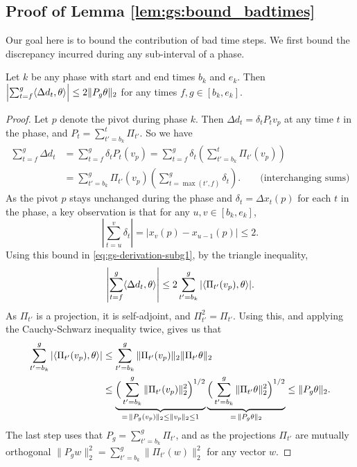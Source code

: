 \subsection {Proof of Lemma \ref{lem:gs:bound_badtimes}}
Our goal here is to bound the contribution of bad time steps. We first bound the discrepancy incurred during any sub-interval of a phase.
\begin{lemma}
\label{lem:gs-discphase}
    Let $k$ be any phase with start and end times $b_k$ and $e_k$. Then $\left|\sum_{t=f}^g \langle  \Delta d_t,\theta\rangle\right| \leq  2 \|P_{g}\theta\|_2$ for any times $f,g \in [b_k, e_k]$. 
\end{lemma}
    \begin{proof}
    Let $p$ denote the pivot during phase $k$.
 Then $\Delta d_t = \delta_t P_t v_p$ at any time $t$ in the phase, and $P_t = \sum_{t'=b_k}^t \Pi_{t'}$. So we have
  \begin{align}
     \sum_{t=f}^g \Delta d_t 
& =\sum_{t=f}^{g} \delta_t  P_t(v_p)  = \sum_{t=f}^{g} \delta_t \left(\sum_{t'=b_k}^t \Pi_{t'}(v_p) \right)
\nonumber \\
 & =  \sum_{t'=b_k}^{g}  \Pi_{t'}(v_p) \left(\sum_{t= \max(t',f)}^{g} \delta_t \right). 
 \qquad \text{(interchanging sums)} \label{eq:gs-derivation-subg1}
\end{align} 
As the pivot $p$ stays unchanged during the phase and $\delta_t= \Delta x_t (p)$ for each $t$ in the phase, a key observation is that  for any $u,v \in [b_k,e_k]$,
\[\left|\sum_{t=u}^{v} \delta_{t}\right| = |x_{v}(p)-x_{u-1}(p) | \leq 2.\]
Using this bound in \eqref{eq:gs-derivation-subg1}, by the triangle inequality,
\[  \left|\sum_{t=f}^g \langle  \Delta d_t,\theta\rangle\right| \leq  2  \sum_{t'=b_k}^{g}  |\langle \Pi_{t'}(v_p),\theta\rangle |. \]
As $\Pi_{t'}$ is a projection, it is self-adjoint, and $\Pi_{t'}^2 =
\Pi_{t'}$. Using this, and applying the Cauchy-Schwarz inequality twice,
gives us that  
\begin{align*} \sum_{t'=b_k}^{g} |  \langle \Pi_{t'}(v_{p}),\theta\rangle| 
      & 
 \leq   \sum_{t'=b_k}^{g} \| \Pi_{t'}(v_{p}) \|_2 \|\Pi_{t'} \theta\|_2 \\
   &  \leq \underbrace{\Big( \sum_{t'=b_k}^{g}  \|\Pi_{t'}(v_{p})\|_2^2 \Big)^{1/2}}_{=\, \|P_g(v_{p})\|_2 \leq \|v_p\|_2\leq 1 } \underbrace{\Big( \sum_{t'=b_k}^{g}  \|\Pi_{t'} \theta\|_2^2 \Big)^{1/2}}_{  =\, \|P_g\theta \|_2  }  
   \leq  \|P_g \theta \|_2.  \end{align*}
   The last step uses that $P_g = \sum_{t'=b_k}^g \Pi_{t'}$, and as the projections $\Pi_{t'}$  are mutually orthogonal  $\|P_g w \|_2^2 = \sum_{t'=b_k}^g \|\Pi_{t'}(w)\|_2^2 $
for any vector $w$.  
\end{proof}
